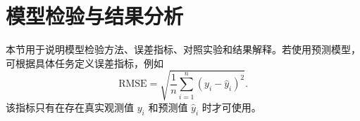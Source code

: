 \section{模型检验与结果分析}

本节用于说明模型检验方法、误差指标、对照实验和结果解释。若使用预测模型，可根据具体任务定义误差指标，例如
\begin{equation}
  \mathrm{RMSE}
  =
  \sqrt{\frac{1}{n}\sum_{i=1}^{n}(y_i-\hat{y}_i)^2}.
  \label{eq:rmse}
\end{equation}
该指标只有在存在真实观测值 $y_i$ 和预测值 $\hat{y}_i$ 时才可使用。

